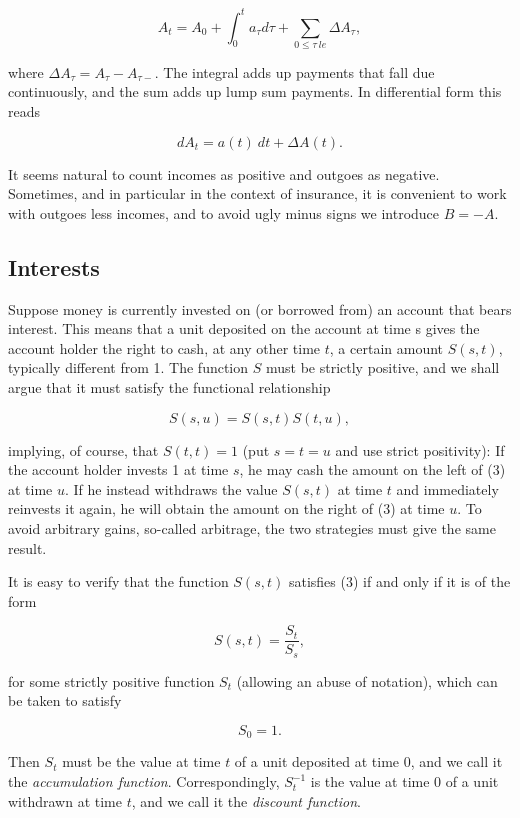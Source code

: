 \documentclass[a4paper,10pt,openany]{book}
\begin{document}
\[
A_t=A_0+\int_0^ta_\tau d\tau+\sum_{0\le \tau\ le}\Delta A_\tau,\tag{1}
\]

where \(\Delta A_\tau=A_\tau-A_{\tau-}\). The integral adds up payments that fall due continuously, and the sum adds up lump sum payments. In differential form this
reads

\[
dA_t=a(t)\ dt+\Delta A(t).\tag{2}
\]

It seems natural to count incomes as positive and outgoes as negative. Sometimes, and in particular in the context of insurance, it is convenient to work with outgoes less incomes, and to avoid ugly minus signs we introduce \(B = -A\).

\hypertarget{interests}{%
\subsection{Interests}\label{interests}}

Suppose money is currently invested on (or borrowed from) an account that bears interest. This means that a unit deposited on the account at time s gives the account holder the right to cash, at any other time \(t\), a certain amount \(S(s,t)\), typically different from 1. The function \(S\) must be strictly positive, and we shall argue that it must satisfy the functional relationship

\[
S(s, u) = S(s, t) S(t, u) ,\tag{3}
\]

implying, of course, that \(S(t,t) = 1\) (put \(s = t = u\) and use strict positivity): If the account holder invests 1 at time \(s\), he may cash the amount on the left of (3) at time \(u\). If he instead withdraws the value \(S(s,t)\) at time \(t\) and immediately reinvests it again, he will obtain the amount on the right of (3) at time \(u\). To avoid arbitrary gains, so-called arbitrage, the two strategies must give the same result.

It is easy to verify that the function \(S(s,t)\) satisfies (3) if and only if it is of the form

\[
S(s,t)=\frac{S_t}{S_s},\tag{4}
\]

for some strictly positive function \(S_t\) (allowing an abuse of notation), which can be taken to satisfy

\[
S_0=1.
\]

Then \(S_t\) must be the value at time \(t\) of a unit deposited at time 0, and we call it the \emph{accumulation function}. Correspondingly, \(S_t^{-1}\) is the value at time 0 of a unit withdrawn at time \(t\), and we call it the \emph{discount function}.
\end{document}
